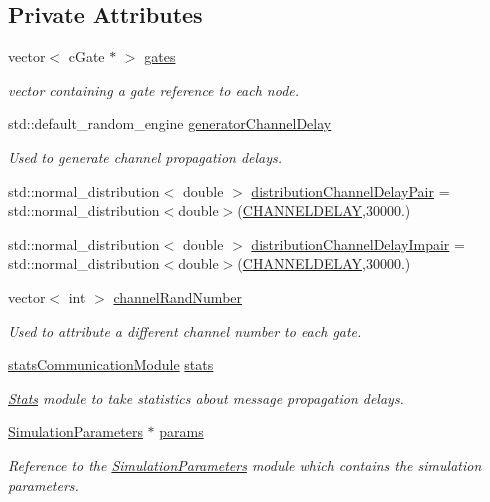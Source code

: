\subsection*{Private Attributes}
\begin{DoxyCompactItemize}
\item 
vector$<$ c\+Gate $\ast$ $>$ \hyperlink{class_communication_dispatcher_adf9f3838d1a7310757886421bb0e5bf7}{gates}
\begin{DoxyCompactList}\small\item\em vector containing a gate reference to each node. \end{DoxyCompactList}\item 
std\+::default\+\_\+random\+\_\+engine \hyperlink{class_communication_dispatcher_a9272f7c52493b1d2ac49c0954174ed1f}{generator\+Channel\+Delay}
\begin{DoxyCompactList}\small\item\em Used to generate channel propagation delays. \end{DoxyCompactList}\item 
std\+::normal\+\_\+distribution$<$ double $>$ \hyperlink{class_communication_dispatcher_a2505530ff3016939eef2ce9005847db1}{distribution\+Channel\+Delay\+Pair} = std\+::normal\+\_\+distribution$<$double$>$(\hyperlink{structures_8h_aa2bfff4413d2bdefb6cb5b708a31660b}{C\+H\+A\+N\+N\+E\+L\+D\+E\+L\+AY},30000.)
\item 
std\+::normal\+\_\+distribution$<$ double $>$ \hyperlink{class_communication_dispatcher_a12848fe0cdce112381265d7c4ba5d62a}{distribution\+Channel\+Delay\+Impair} = std\+::normal\+\_\+distribution$<$double$>$(\hyperlink{structures_8h_aa2bfff4413d2bdefb6cb5b708a31660b}{C\+H\+A\+N\+N\+E\+L\+D\+E\+L\+AY},30000.)
\item 
vector$<$ int $>$ \hyperlink{class_communication_dispatcher_acd67954c5bf9280a33d069ae4b217e1c}{channel\+Rand\+Number}
\begin{DoxyCompactList}\small\item\em Used to attribute a different channel number to each gate. \end{DoxyCompactList}\item 
\hyperlink{communication_dispatcher_8h_a9d0242025c5ba7fecd1b0c41f4777c06}{stats\+Communication\+Module} \hyperlink{class_communication_dispatcher_a5e01e95460682f3a31417efab24b25e4}{stats}
\begin{DoxyCompactList}\small\item\em \hyperlink{class_stats}{Stats} module to take statistics about message propagation delays. \end{DoxyCompactList}\item 
\hyperlink{class_simulation_parameters}{Simulation\+Parameters} $\ast$ \hyperlink{class_communication_dispatcher_a53751662d1e770a60ddbeea9d4a5d845}{params}
\begin{DoxyCompactList}\small\item\em Reference to the \hyperlink{class_simulation_parameters}{Simulation\+Parameters} module which contains the simulation parameters. \end{DoxyCompactList}\end{DoxyCompactItemize}


